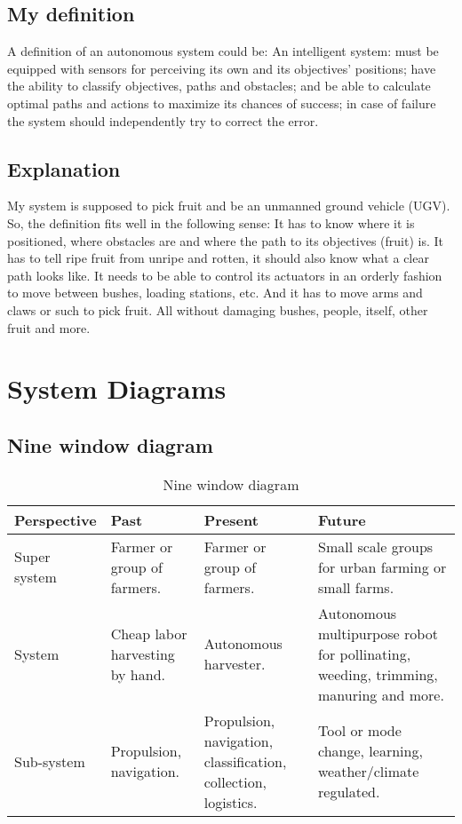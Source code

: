 \documentclass[%
oneside,    %
project,    %
nosummary   %
]{USN-MSc}
\begin{document}
\section{My definition}
\label{sec:myDefinition}
A definition of an autonomous system could be:
An intelligent system: must be equipped with sensors for perceiving its own and its objectives' positions; 
have the ability to classify objectives, paths and obstacles; 
and be able to calculate optimal paths and actions to maximize its chances of success;
in case of failure the system should independently try to correct the error.

\section{Explanation}
\label{sec:myExplanation}
My system is supposed to pick fruit and be an unmanned ground vehicle (UGV).
So, the definition fits well in the following sense:
It has to know where it is positioned, where obstacles are and where the path to its objectives (fruit) is.
It has to tell ripe fruit from unripe and rotten, it should also know what a clear path looks like.
It needs to be able to control its actuators in an orderly fashion to move between bushes, loading stations, etc. 
And it has to move arms and claws or such to pick fruit. All without damaging bushes, people, itself, other fruit and more.

\chapter{System Diagrams}
\label{ch:diagrams}
\lipsum[4]

\section{Nine window diagram}
\label{sec:nineWindow}
\lipsum[4]
\begin{table}[!ht]
  \caption{Nine window diagram}
   \centering
    \begin{tabular}{ | m{3cm} | m{3cm} | m{3cm} | m{5cm} |}
     \hline
     Perspective & Past & Present & Future \\ \hline
     Super system & Farmer or group of farmers. & Farmer or group of farmers. 
     & Small scale groups for urban farming or small farms. \\ \hline
     System & Cheap labor harvesting by hand. & Autonomous harvester. 
     & Autonomous multipurpose robot for pollinating, weeding, trimming, manuring and more. \\ \hline
     Sub-system & Propulsion, navigation. & Propulsion, navigation, classification, collection, logistics. 
     & Tool or mode change, learning, weather/climate regulated. \\ \hline
     \end{tabular}
 \end{table}
\end{document}

